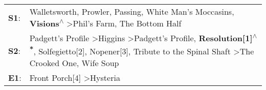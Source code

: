 \begin{supertabular}{p{0.03\textwidth}p{0.92\textwidth}}
 \textbf{S1}:  &                                                                                                                                      Walletsworth\textsuperscript{}, \enspace Prowler\textsuperscript{}, \enspace Passing\textsuperscript{}, \enspace White Man's Moccasins\textsuperscript{}, \enspace \textbf{Visions\textsuperscript{$\wedge$}} \textgreater \enspace Phil's Farm\textsuperscript{}, \enspace The Bottom Half\textsuperscript{}  \enspace  \\
 \textbf{S2}:  &  Padgett's Profile\textsuperscript{} \textgreater \enspace Higgins\textsuperscript{} \textgreater \enspace Padgett's Profile\textsuperscript{}, \enspace \textbf{Resolution[1]\textsuperscript{$\wedge$*}}, \enspace Solfegietto[2]\textsuperscript{}, \enspace Nopener[3]\textsuperscript{}, \enspace Tribute to the Spinal Shaft\textsuperscript{} \textgreater \enspace The Crooked One\textsuperscript{}, \enspace Wife Soup\textsuperscript{}  \enspace  \\
 \textbf{E1}:  &                                                                                                                                                                                                                                                                                                                                                                  Front Porch[4]\textsuperscript{} \textgreater \enspace Hysteria\textsuperscript{}  \enspace  \\
\end{supertabular}
